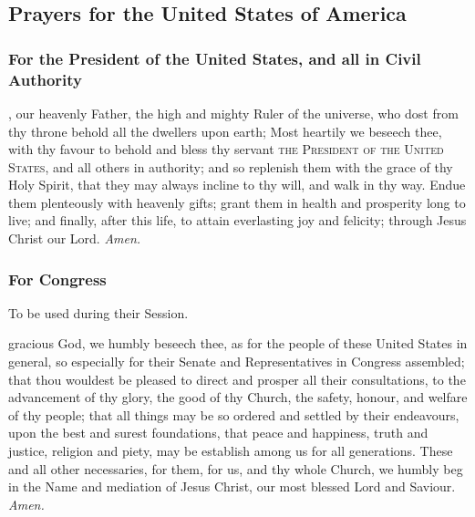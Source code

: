 \fancyhead[RO,LE]{}
\fancyhead[RE,LO]{}
\label{prayers}
{}

\subsection{Prayers for the United States of America}
\subsubsection{For the President of the United States, and all in Civil Authority}
, our heavenly Father, the high and mighty Ruler of the universe, who dost from thy throne behold all the dwellers upon earth; Most heartily we beseech thee, with thy favour to behold and bless thy servant \textsc{the President of the United States}, and all others in authority; and so replenish them with the grace of thy Holy Spirit, that they may always incline to thy will, and walk in thy way. Endue them plenteously with heavenly gifts; grant them in health and prosperity long to live; and finally, after this life, to attain everlasting joy and felicity; through Jesus Christ our Lord. \textit{Amen.}

\subsubsection{For Congress}
\begin{rubric}
To be used during their Session.
\end{rubric}
 gracious God, we humbly beseech thee, as for the people of these United States in general, so especially for their Senate and Representatives in Congress assembled; that thou wouldest be pleased to direct and prosper all their consultations, to the advancement of thy glory, the good of thy Church, the safety, honour, and welfare of thy people; that all things may be so ordered and settled by their endeavours, upon the best and surest foundations, that peace and happiness, truth and justice, religion and piety, may be establish among us for all generations. These and all other necessaries, for them, for us, and thy whole Church, we humbly beg in the Name and mediation of Jesus Christ, our most blessed Lord and Saviour. \textit{Amen.}

